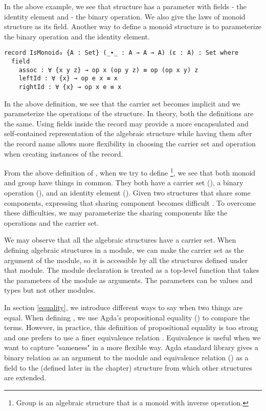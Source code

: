 In the above example, we see that  structure has a parameter
 with fields  - the identity element and  -
the binary operation. We also give the laws of monoid structure as its field.
Another way to define a monoid structure is to parameterize the binary operation
and the identity element.

\begin{verbatim}
record IsMonoid₀ {A : Set} (_∙_ : A → A → A) (ε : A) : Set where
  field
    assoc : ∀ {x y z} → op x (op y z) ≡ op (op x y) z
    leftId : ∀ {x} → op e x ≡ x
    rightId : ∀ {x} → op x e ≡ x 
\end{verbatim}

In the above definition, we see that the carrier set  becomes implicit
and we parameterize the operations of the structure. In theory, both the
definitions are the same. Using fields inside the record may provide a more
encapsulated and self-contained representation of the algebraic structure while
having them after the record name allows more flexibility in choosing the
carrier set and operation when creating instances of the record. 

From the above definition of , when we try to define
\footnote{Group is an algebraic structure that is a monoid with
inverse operation.}, we see that both monoid and group have things in common.
They both have a carrier set (), a binary operation (), and
an identity element (). Given two structures that share some
components, expressing that sharing component becomes difficult \cite{musa}. To
overcome these difficulties, we may parameterize the sharing components like the
operations and the carrier set.

We may observe that all the algebraic structures have a carrier set. When
defining algebraic structures in a module, we can make the carrier set as the
argument of the module, so it is accessible by all the structures defined under
that module. The module declaration is treated as a top-level function that takes
the parameters of the module as arguments. The parameters can be values and types
but not other modules.

In section \ref{equality}, we introduce different ways to say when two things
are equal. When defining , we use Agda's propositional equality
() to compare the terms. However, in practice, this definition of
propositional equality is too strong and one prefers to use a finer equivalence
relation \cite{musa}. Equivalence is useful when we want to capture "sameness"
in a more flexible way. Agda standard library gives a binary relation as an
argument to the module and equivalence relation () as a
field to the  (defined later in the chapter) structure from
which other structures are extended.
 
